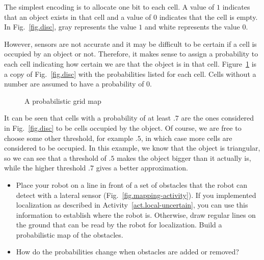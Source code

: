 The simplest encoding is to allocate one bit to each cell. A value of $1$ indicates that an object exists in that cell and a value of $0$ indicates that the cell is empty. In Fig.~\ref{fig.disc}, gray represents the value $1$ and white represents the value $0$.

However, sensors are not accurate and it may be difficult to be certain if a cell is occupied by an object or not. Therefore, it makes sense to assign a probability to each cell indicating how certain we are that the object is in that cell. Figure~\ref{fig.prob-grid} is a copy of Fig.~\ref{fig.disc} with the probabilities listed for each cell. Cells without a number are assumed to have a probability of $0$.

\begin{figure}
\begin{center}
\caption{A probabilistic grid map}\label{fig.prob-grid}
\end{center}
\end{figure}

It can be seen that cells with a probability of at least $.7$ are the ones considered in Fig.~\ref{fig.disc} to be cells occupied by the object. Of course, we are free to choose some other threshold, for example $.5$, in which case more cells are considered to be occupied. In this example, we know that the object is triangular, so we can see that a threshold of $.5$ makes the object bigger than it actually is, while the higher threshold $.7$ gives a better approximation.

\begin{framed}
\begin{itemize}
\item Place your robot on a line in front of a set of obstacles that the robot can detect with a lateral sensor (Fig.~\ref{fig.mapping-activity}). If you implemented localization as described in Activity~\ref{act.local-uncertain}, you can use this information to establish where the robot is. Otherwise, draw regular lines on the ground that can be read by the robot for localization. Build a probabilistic map of the obstacles.
\item How do the probabilities change when obstacles are added or removed?
\end{itemize}
\end{framed}

